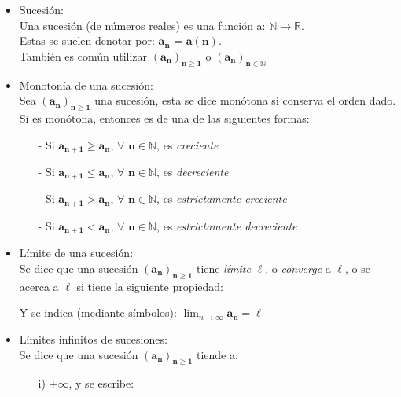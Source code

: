 \documentclass[a4paper,11pt]{report}
\begin{document}
\begin{itemize}
{\large Parte II} \\[5pt]
{\huge Sucesiones y límite}
\item Sucesión: \\
Una sucesión (de números reales) es una función a: $\mathbb{N} \longrightarrow \mathbb{R}$. \\
Estas se suelen denotar por: $\mathbf{a_n}$ = $\mathbf{a(n)}$. \\
También es común utilizar $\mathbf{(a_n)_{n \geqslant 1}}$ o $\mathbf{(a_n)_{n \in \mathbb{N}}}$
\item Monotonía de una sucesión: \\
Sea $\mathbf{(a_n)_{n \geqslant 1}}$ una sucesión, esta se dice monótona si conserva el orden dado. Si es monótona, entonces es de una de las siguientes formas: \\
\begin{itemize}
\item[-] Si $\mathbf{a_{n+1}} \geqslant \mathbf{a_n}$, $\forall$ $\mathbf{n} \in \mathbb{N}$, es \emph{creciente}
\item[-] Si $\mathbf{a_{n+1}} \leqslant \mathbf{a_n}$, $\forall$ $\mathbf{n} \in \mathbb{N}$, es \emph{decreciente}
\item[-] Si $\mathbf{a_{n+1}} > \mathbf{a_n}$, $\forall$ $\mathbf{n} \in \mathbb{N}$, es \emph{estrictamente creciente}
\item[-] Si $\mathbf{a_{n+1}} < \mathbf{a_n}$, $\forall$ $\mathbf{n} \in \mathbb{N}$, es \emph{estrictamente decreciente}
\end{itemize} 
\item Límite de una sucesión: \\
Se dice que una sucesión $\mathbf{(a_n)_{n \geqslant 1}}$ tiene \emph{límite} $\ell$, o \emph{converge} a $\ell$, o se acerca a $\ell$ si tiene la siguiente propiedad: \\
Y se indica (mediante símbolos): $\displaystyle \lim_{n\to\infty} \mathbf{a_n} = \ell $
\item Límites infinitos de sucesiones: \\
Se dice que una sucesión  $\mathbf{(a_n)_{n \geqslant 1}}$ tiende a:
\begin{itemize}
\item[i)] $+\infty$, y se escribe: \\

\end{itemize}
\end{itemize}
\end{document}
